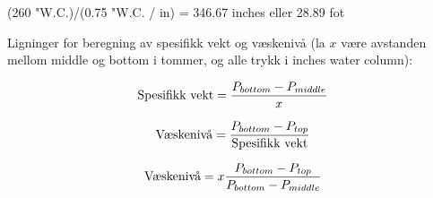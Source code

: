 (260 "W.C.)/(0.75 "W.C. / in) = 346.67 inches eller 28.89 fot

\vskip 30pt

Ligninger for beregning av spesifikk vekt og væskenivå (la $x$ være avstanden mellom middle og bottom i tommer, og alle trykk i inches water column):

$$\hbox{Spesifikk vekt} = {{P_{bottom} - P_{middle}} \over x}$$

\vskip 10pt

$$\hbox{Væskenivå} = {{P_{bottom} - P_{top}} \over \hbox{Spesifikk vekt}}$$

$$\hbox{Væskenivå} = x{{P_{bottom} - P_{top}} \over {P_{bottom} - P_{middle}}}$$









